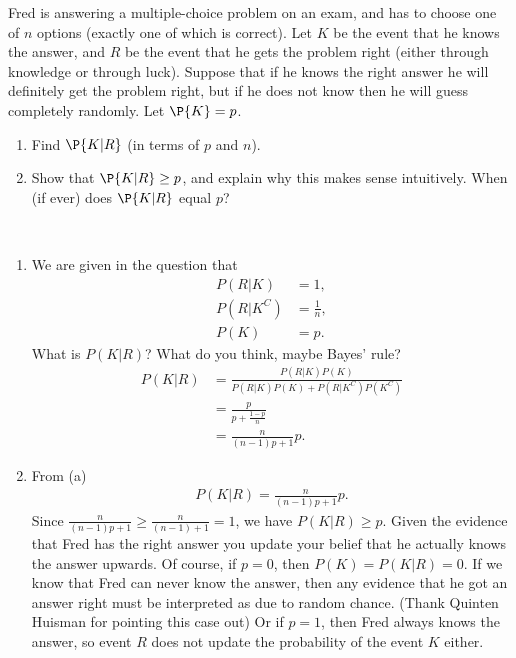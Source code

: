 
\begin{exercise}[BH.2.4]
\setcounter{theorem}{2}
Fred is answering a multiple-choice problem on an exam, and has to choose one of $n$ options (exactly one of which is correct). Let $K$ be the event that he knows the answer, and $R$ be the event that he gets the problem right (either through knowledge or through luck). Suppose that if he knows the right answer he will definitely get the problem right, but if he does not know then he will guess completely randomly. Let $\P{K} = p$.
	\begin{enumerate}
		\item Find $\P{K|R}$ (in terms of $p$ and $n$).
		\item Show that $\P{K|R} \geq p$, and explain why this makes sense intuitively. When (if ever) does $\P{K|R}$ equal $p$?
	\end{enumerate}
\begin{solution}~
	\begin{enumerate}
		\item We are given in the question that
		\begin{align*}
			P(R|K) &= 1,\\
			P(R|K^{C})&=\frac{1}{n},\\
			P(K) &= p.
		\end{align*}
		What is $P(K|R)$? What do you think, maybe Bayes' rule?
		\begin{align*}
			P(K|R)& = \frac{P(R|K)P(K)}{P(R|K)P(K)+P(R|K^{C})P(K^{C})}\\
			&=\frac{p}{p + \frac{1-p}{n}}\\
			& = \frac{n}{(n-1)p+1}p.
		\end{align*}
		\item  From (a)
		\begin{align*}
			P(K|R) = \frac{n}{(n-1)p+1}p.
		\end{align*}
		Since $\frac{n}{(n-1)p+1}\geq \frac{n}{(n-1)+1} = 1$, we have $P(K|R)\geq p$. Given the evidence that Fred has the right answer you update your belief that he actually knows the answer upwards. Of course, if $p=0$, then $P(K)=P(K|R)=0$. If we know that Fred can never know the answer, then any evidence that he got an answer right must be interpreted as due to random chance. (Thank Quinten Huisman for pointing this case out) Or if $p=1$, then Fred always knows the answer, so event $R$ does not update the probability of the event $K$ either. 
	\end{enumerate}
\end{solution}
\end{exercise}

